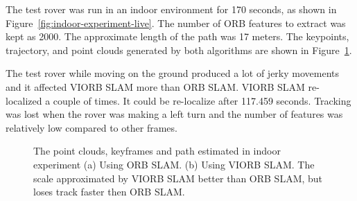 The test rover was run in an indoor environment for 170 seconds, as shown in Figure~\ref{fig:indoor-experiment-live}. The number of ORB features to extract was kept as 2000. The approximate length of the path was 17 meters. The keypoints, trajectory, and point clouds generated by both algorithms are shown in Figure~\ref{fig:indoor-path-visualization}.

The test rover while moving on the ground produced a lot of jerky movements and it affected VIORB SLAM more than ORB SLAM. VIORB SLAM re-localized a couple of times. It could be re-localize after 117.459 seconds. Tracking was lost when the rover was making a left turn and the number of features was relatively low compared to other frames.

\begin{figure}[h]
	
	\caption[Indoor experiment.]{\small 
		The point clouds, keyframes and path estimated in indoor experiment (a) Using ORB SLAM. (b) Using VIORB SLAM. The scale approximated by VIORB SLAM better than ORB SLAM, but loses track faster then ORB SLAM.}
	\label{fig:indoor-path-visualization}
	
\end{figure}

